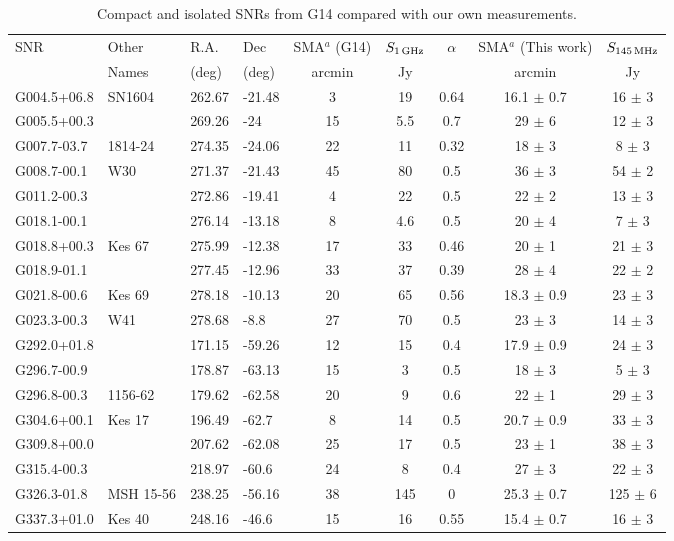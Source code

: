 \documentclass[useAMS,usenatbib]{mn2e}
\begin{document}
\begin{table}
\caption{Compact and isolated SNRs from G14 compared with our own measurements.}
\begin{tabular}{llllccccc}
\hline
SNR	&	Other	&	R.A.	&	Dec	&	SMA$^a$ (G14)	&	$S_{1\,{\rm GHz}}$ &	$\alpha$ 	&	SMA$^a$  (This work)			&	$S_{145\,{\rm MHz}}$			\\
	&	Names	&	(deg)	&	(deg)	&	arcmin	&	Jy	&		&	arcmin			&	Jy			\\
\hline																					
G004.5+06.8	&	SN1604	&	262.67	&	-21.48	&	3	&	19	&	0.64	&	16.1	$\pm$	0.7	&	16	$\pm$	3	\\
G005.5+00.3	&		&	269.26	&	-24	&	15	&	5.5	&	0.7	&	29	$\pm$	6	&	12	$\pm$	3	\\
G007.7-03.7	&	1814-24	&	274.35	&	-24.06	&	22	&	11	&	0.32	&	18	$\pm$	3	&	8	$\pm$	3	\\
G008.7-00.1	&	W30	&	271.37	&	-21.43	&	45	&	80	&	0.5	&	36	$\pm$	3	&	54	$\pm$	2	\\
G011.2-00.3	&		&	272.86	&	-19.41	&	4	&	22	&	0.5	&	22	$\pm$	2	&	13	$\pm$	3	\\
G018.1-00.1	&		&	276.14	&	-13.18	&	8	&	4.6	&	0.5	&	20	$\pm$	4	&	7	$\pm$	3	\\
G018.8+00.3	&	Kes 67	&	275.99	&	-12.38	&	17	&	33	&	0.46	&	20	$\pm$	1	&	21	$\pm$	3	\\
G018.9-01.1	&		&	277.45	&	-12.96	&	33	&	37	&	0.39	&	28	$\pm$	4	&	22	$\pm$	2	\\
G021.8-00.6	&	Kes 69	&	278.18	&	-10.13	&	20	&	65	&	0.56	&	18.3	$\pm$	0.9	&	23	$\pm$	3	\\
G023.3-00.3	&	W41	&	278.68	&	-8.8	&	27	&	70	&	0.5	&	23	$\pm$	3	&	14	$\pm$	3	\\
G292.0+01.8	&		&	171.15	&	-59.26	&	12	&	15	&	0.4	&	17.9	$\pm$	0.9	&	24	$\pm$	3	\\
G296.7-00.9	&		&	178.87	&	-63.13	&	15	&	3	&	0.5	&	18	$\pm$	3	&	5	$\pm$	3	\\
G296.8-00.3	&	1156-62	&	179.62	&	-62.58	&	20	&	9	&	0.6	&	22	$\pm$	1	&	29	$\pm$	3	\\
G304.6+00.1	&	Kes 17	&	196.49	&	-62.7	&	8	&	14	&	0.5	&	20.7	$\pm$	0.9	&	33	$\pm$	3	\\
G309.8+00.0	&		&	207.62	&	-62.08	&	25	&	17	&	0.5	&	23	$\pm$	1	&	38	$\pm$	3	\\
G315.4-00.3	&		&	218.97	&	-60.6	&	24	&	8	&	0.4	&	27	$\pm$	3	&	22	$\pm$	3	\\
G326.3-01.8	&	MSH 15-56	&	238.25	&	-56.16	&	38	&	145	&	0	&	25.3	$\pm$	0.7	&	125	$\pm$	6	\\
G337.3+01.0	&	Kes 40	&	248.16	&	-46.6	&	15	&	16	&	0.55	&	15.4	$\pm$	0.7	&	16	$\pm$	3	\\

\end{tabular}
\end{table}
\end{document}
